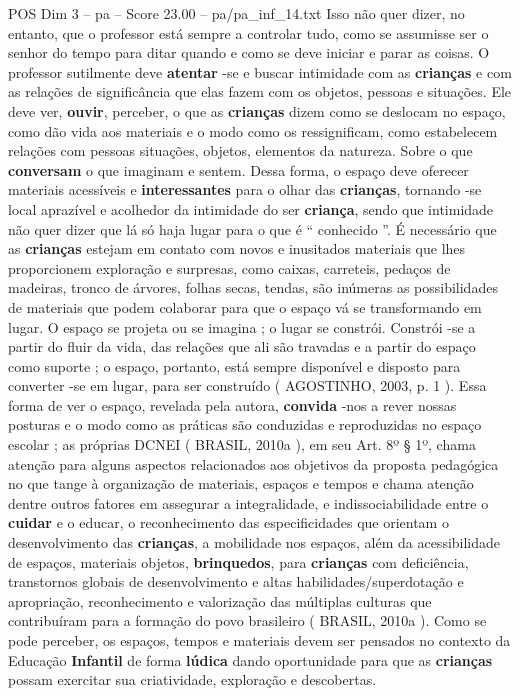 \begin{textsample}{POS Dim 3 – pa – Score 23.00 – pa/pa\_inf\_14.txt}
Isso não quer dizer, no entanto, que o professor está sempre a controlar tudo, como se assumisse ser o senhor do tempo para ditar quando e como se deve iniciar e parar as coisas.
O professor sutilmente deve \textbf{atentar} -se e buscar intimidade com as \textbf{crianças} e com as relações de significância que elas fazem com os objetos, pessoas e situações.
Ele deve ver, \textbf{ouvir}, perceber, o que as \textbf{crianças} dizem como se deslocam no espaço, como dão vida aos materiais e o modo como os ressignificam, como estabelecem relações com pessoas situações, objetos, elementos da natureza.
Sobre o que \textbf{conversam} o que imaginam e sentem.
Dessa forma, o espaço deve oferecer materiais acessíveis e \textbf{interessantes} para o olhar das \textbf{crianças}, tornando -se local aprazível e acolhedor da intimidade do ser \textbf{criança}, sendo que intimidade não quer dizer que lá só haja lugar para o que é “ conhecido ”.
É necessário que as \textbf{crianças} estejam em contato com novos e inusitados materiais que lhes proporcionem exploração e surpresas, como caixas, carreteis, pedaços de madeiras, tronco de árvores, folhas secas, tendas, são inúmeras as possibilidades de materiais que podem colaborar para que o espaço vá se transformando em lugar.
O espaço se projeta ou se imagina ; o lugar se constrói.
Constrói -se a partir do fluir da vida, das relações que ali são travadas e a partir do espaço como suporte ; o espaço, portanto, está sempre disponível e disposto para converter -se em lugar, para ser construído ( AGOSTINHO, 2003, p. 1 ).
Essa forma de ver o espaço, revelada pela autora, \textbf{convida} -nos a rever nossas posturas e o modo como as práticas são conduzidas e reproduzidas no espaço escolar ; as próprias DCNEI ( BRASIL, 2010a ), em seu Art. 8º § 1º, chama atenção para alguns aspectos relacionados aos objetivos da proposta pedagógica no que tange à organização de materiais, espaços e tempos e chama atenção dentre outros fatores em assegurar a integralidade, e indissociabilidade entre o \textbf{cuidar} e o educar, o reconhecimento das especificidades que orientam o desenvolvimento das \textbf{crianças}, a mobilidade nos espaços, além da acessibilidade de espaços, materiais objetos, \textbf{brinquedos}, para \textbf{crianças} com deficiência, transtornos globais de desenvolvimento e altas habilidades/superdotação e apropriação, reconhecimento e valorização das múltiplas culturas que contribuíram para a formação do povo brasileiro ( BRASIL, 2010a ).
Como se pode perceber, os espaços, tempos e materiais devem ser pensados no contexto da Educação \textbf{Infantil} de forma \textbf{lúdica} dando oportunidade para que as \textbf{crianças} possam exercitar sua criatividade, exploração e descobertas.

\end{textsample}
